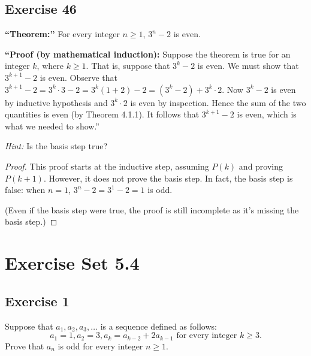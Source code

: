 \documentclass[14pt]{extarticle}
\begin{document}
\subsection{Exercise 46}
{\bf “Theorem:”} For every integer $n \geq 1$, $3^n - 2$ is even.

    {\bf “Proof (by mathematical induction):} Suppose the theorem is true for an integer $k$, where $k \geq 1$. That is, suppose that $3^k - 2$ is even. We must show that $3^{k+1} - 2$ is even. Observe that $3^{k+1} - 2 = 3^k \cdot 3 - 2 = 3^k(1 + 2) - 2 = (3^k - 2) + 3^k \cdot 2$. Now $3^k - 2$ is even by inductive hypothesis and $3^k \cdot 2$ is even by inspection. Hence the sum of the two quantities is even (by Theorem 4.1.1). It follows that $3^{k+1} - 2$ is even, which is what we needed to show.”

{\it Hint:} Is the basis step true?

\begin{proof}
    This proof starts at the inductive step, assuming $P(k)$ and proving $P(k+1)$. However, it does not prove the basis step. In fact, the basis step is false: when $n = 1$, $3^n - 2 = 3^1 - 2 = 1$ is odd.

    (Even if the basis step were true, the proof is still incomplete as it's missing the basis step.)
\end{proof}

\section{Exercise Set 5.4}

\subsection{Exercise 1}
Suppose that $a_1, a_2, a_3, \ldots$ is a sequence defined
as follows:
\[
    a_1 = 1, a_2 = 3, a_k = a_{k-2} + 2a_{k-1} \text{ for every integer $k \geq 3$.}
\]
Prove that $a_n$ is odd for every integer $n \geq 1$.
\end{document}
